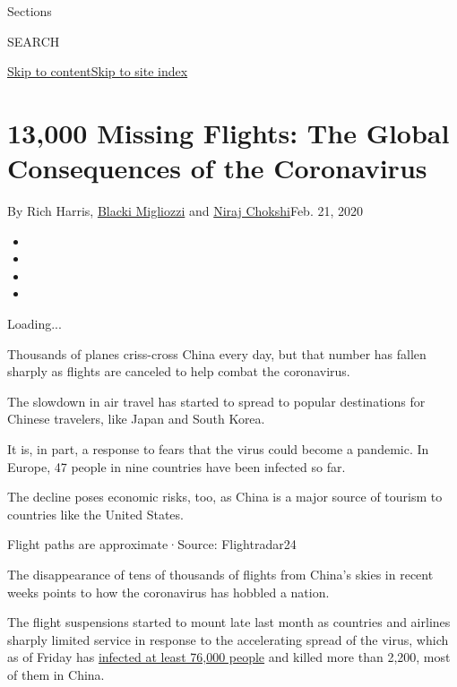 Sections

SEARCH

\protect\hyperlink{site-content}{Skip to
content}\protect\hyperlink{site-index}{Skip to site index}

\hypertarget{13000-missing-flights-the-global-consequences-of-the-coronavirus}{%
\section{13,000 Missing Flights: The Global Consequences of the
Coronavirus}\label{13000-missing-flights-the-global-consequences-of-the-coronavirus}}

By Rich Harris,
\href{https://www.nytimes3xbfgragh.onion/by/blacki-migliozzi}{Blacki
Migliozzi} and
\href{https://www.nytimes3xbfgragh.onion/by/niraj-chokshi}{Niraj
Chokshi}Feb. 21, 2020

\begin{itemize}
\item
\item
\item
\item
\end{itemize}

Loading...

Thousands of planes criss-cross China every day, but that number has
fallen sharply as flights are canceled to help combat the coronavirus.

The slowdown in air travel has started to spread to popular destinations
for Chinese travelers, like Japan and South Korea.

It is, in part, a response to fears that the virus could become a
pandemic. In Europe, 47 people in nine countries have been infected so
far.

The decline poses economic risks, too, as China is a major source of
tourism to countries like the United States.

Flight paths are approximate·Source: Flightradar24

The disappearance of tens of thousands of flights from China's skies in
recent weeks points to how the coronavirus has hobbled a nation.

The flight suspensions started to mount late last month as countries and
airlines sharply limited service in response to the accelerating spread
of the virus, which as of Friday has
\href{https://www.nytimes3xbfgragh.onion/interactive/2020/world/asia/china-wuhan-coronavirus-maps.html}{infected
at least 76,000 people} and killed more than 2,200, most of them in
China.

